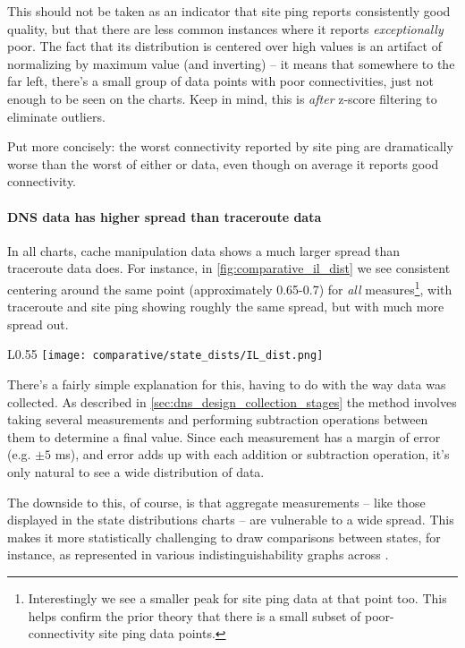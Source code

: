 This should not be taken as an indicator that site ping reports consistently good quality, but that there are less common instances where it reports \textit{exceptionally} poor. The fact that its distribution is centered over high values is an artifact of normalizing by maximum value (and inverting) -- it means that somewhere to the far left, there's a small group of data points with poor connectivities, just not enough to be seen on the \kde charts. Keep in mind, this is \textit{after} z-score filtering to eliminate outliers.

Put more concisely: the worst connectivity reported by site ping are dramatically worse than the worst of either \dns or \caida data, even though on average it reports good connectivity.

\paragraph{DNS data has higher spread than traceroute data} In all charts, \dns cache manipulation data shows a much larger spread than traceroute data does. For instance, in \cref{fig:comparative_il_dist} we see consistent centering around the same point (approximately 0.65-0.7) for \textit{all} measures\footnote{Interestingly we see a smaller peak for site ping data at that point too. This helps confirm the prior theory that there is a small subset of poor-connectivity site ping data points.}, with traceroute and site ping showing roughly the same spread, but with \dns much more spread out.

\begin{wrapfigure}[17]{L}{0.55\textwidth}
    \centering
    \texttt{[image: comparative/state\_dists/IL\_dist.png]}
    \caption{Illinois data distributions}
    \label{fig:comparative_il_dist}
\end{wrapfigure}

There's a fairly simple explanation for this, having to do with the way data was collected. As described in \cref{sec:dns_design_collection_stages} the \dns method involves taking several measurements and performing subtraction operations between them to determine a final value. Since each measurement has a margin of error (e.g. $\pm5$ ms), and error adds up with each addition or subtraction operation, it's only natural to see a wide distribution of data.

The downside to this, of course, is that aggregate measurements -- like those displayed in the state distributions charts -- are vulnerable to a wide spread. This makes it more statistically challenging to draw comparisons between states, for instance, as represented in various indistinguishability graphs across .


